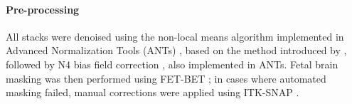 \documentclass[preprint,authoryear,12pt]{elsarticle}
\begin{document}
\begin{table}[h]
\centering
\caption{Summary of dataset acquisition parameters.}
\label{tab:datasets}

\renewcommand{\arraystretch}{1.2}
\setlength{\tabcolsep}{3pt}
\end{table}


\paragraph{Pre-processing}
All stacks were denoised using the non-local means algorithm implemented in Advanced Normalization Tools (ANTs) \citep{avants2009ants}, based on the method introduced by \cite{manjon_adaptive_2010}, followed by N4 bias field correction \citep{tustison_n4itk_2010}, also implemented in ANTs. Fetal brain masking was then performed using FET-BET \citep{faghihpirayesh2024fetal}; in cases where automated masking failed, manual corrections were applied using ITK-SNAP \citep{yushkevich_itk-snap_2016}.
\end{document}
